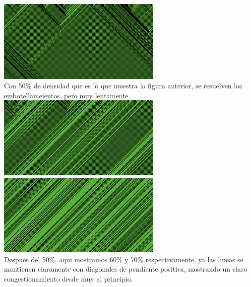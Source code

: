 \documentclass{article}
\begin{document}
\begin{enumerate}
\includegraphics[width=300px]{184-50.png}\\
Con 50\% de densidad que es lo que muestra la figura anterior, se resuelven los embotellameientos, pero muy lentamente.\\
\includegraphics[width=300px]{184-60.png}\\
\includegraphics[width=300px]{184-70.png}\\
Despues del 50\%, aqui mostramos 60\% y 70\% respectivamente, ya las lineas se mantienen claramente con diagonales de pendiente positiva, mostrando un claro congestionamiento desde muy al principio.


\end{enumerate}
\end{document}

